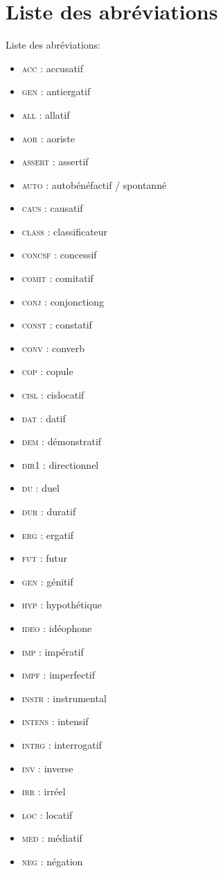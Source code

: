 \documentclass[oldfontcommands,twoside,a4paper,11pt,draft]{memoir}
\newcommand{\acc}{\textsc{acc}}
\newcommand{\antierg}{\textsc{gen}}
\newcommand{\allat}{\textsc{all}}
\newcommand{\aor}{\textsc{aor}}
\newcommand{\assert}{\textsc{assert}}
\newcommand{\auto}{\textsc{auto}}
\newcommand{\caus}{\textsc{caus}}
\newcommand{\classif}{\textsc{class}}
\newcommand{\concessif}{\textsc{concsf}}
\newcommand{\comit}{\textsc{comit}}
\newcommand{\conj}{\textsc{conj}}
\newcommand{\const}{\textsc{const}}
\newcommand{\conv}{\textsc{conv}}
\newcommand{\cop}{\textsc{cop}}
\newcommand{\cisl}{\textsc{cisl}}
\newcommand{\dat}{\textsc{dat}}
\newcommand{\dem}{\textsc{dem}}
\newcommand{\dir}{\textsc{dir1}}
\newcommand{\du}{\textsc{du}}
\newcommand{\dur}{\textsc{dur}}
\newcommand{\erg}{\textsc{erg}}
\newcommand{\fut}{\textsc{fut}}
\newcommand{\gen}{\textsc{gen}}
\newcommand{\hypot}{\textsc{hyp}}
\newcommand{\ideo}{\textsc{ideo}}
\newcommand{\imp}{\textsc{imp}}
\newcommand{\impf}{\textsc{impf}}
\newcommand{\instr}{\textsc{instr}}
\newcommand{\intens}{\textsc{intens}}
\newcommand{\intrg}{\textsc{intrg}}
\newcommand{\inv}{\textsc{inv}}
\newcommand{\irreel}{\textsc{irr}}
\newcommand{\loc}{\textsc{loc}}
\newcommand{\med}{\textsc{med}}
\newcommand{\negat}{\textsc{neg}}
\begin{document}
\section*{Liste des abréviations}
 Liste des abréviations:
 \begin{multicols}{2}
\begin{itemize}
 \item \acc{} : accusatif
\item \antierg{} : antiergatif
\item \allat{} : allatif
\item \aor{} : aoriste
\item \assert{} : assertif
\item \auto{} : autobénéfactif / spontanné
\item \caus{} : causatif
\item \classif{} : classificateur
\item \concessif{} : concessif
\item \comit{} : comitatif
\item \conj{} : conjonctiong
\item \const{} : constatif
\item \conv{} : converb
\item \cop{} : copule
\item \cisl{} : cislocatif
\item \dat{} : datif
\item \dem{} : démonstratif
\item \dir{} : directionnel
\item \du{} : duel
\item \dur{} : duratif
\item \erg{} : ergatif
\item \fut{} : futur
\item \gen{} : génitif
\item \hypot{} : hypothétique
\item \ideo{} : idéophone
\item \imp{} : impératif
\item \impf{} : imperfectif
\item \instr{} : instrumental
\item \intens{} : intensif
\item \intrg{} : interrogatif
\item \inv{} : inverse
\item \irreel{} : irréel
\item \loc{} : locatif
\item \med{} : médiatif
\item \negat{} : négation

\end{itemize}
\end{multicols}
\end{document}
